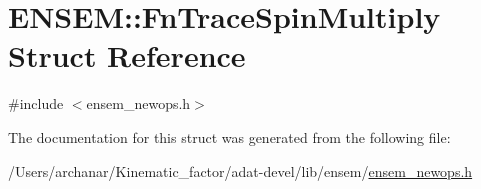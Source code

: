 \hypertarget{structENSEM_1_1FnTraceSpinMultiply}{}\section{E\+N\+S\+EM\+:\+:Fn\+Trace\+Spin\+Multiply Struct Reference}
\label{structENSEM_1_1FnTraceSpinMultiply}


{\ttfamily \#include $<$ensem\+\_\+newops.\+h$>$}



The documentation for this struct was generated from the following file\+:\begin{DoxyCompactItemize}
\item 
/\+Users/archanar/\+Kinematic\+\_\+factor/adat-\/devel/lib/ensem/\mbox{\hyperlink{adat-devel_2lib_2ensem_2ensem__newops_8h}{ensem\+\_\+newops.\+h}}\end{DoxyCompactItemize}
